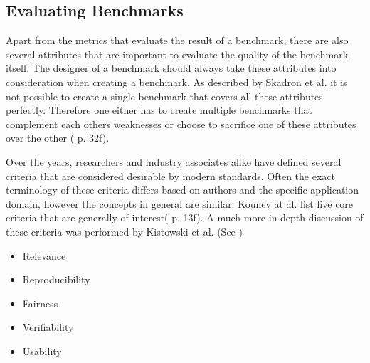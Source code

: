 \documentclass[	runningheads,
				a4paper]{llncs}
\begin{document}

\subsection{Evaluating Benchmarks}
\label{ssec:eval_bm}
Apart from the metrics that evaluate the result of a benchmark, there are also several attributes that are important to evaluate the quality of the benchmark itself. The designer of a benchmark should always take these attributes into consideration when creating a benchmark. As described by Skadron et al. it is not possible to create a single benchmark that covers all these attributes perfectly. Therefore one either has to create multiple benchmarks that complement each others weaknesses or choose to sacrifice one of these attributes over the other (\cite{Skadron2003} p. 32f).

Over the years, researchers and industry associates alike have defined several criteria that are considered desirable by modern standards. Often the exact terminology of these criteria differs based on authors and the specific application domain, however the concepts in general are similar. Kounev at al. list five core criteria that are generally of interest(\cite{Kounev} p. 13f). A much more in depth discussion of these criteria was performed by Kistowski et al. (See \cite{kistowski2015})
\begin{itemize}
	\item Relevance
	\item Reproducibility
	\item Fairness
	\item Verifiability
	\item Usability
\end{itemize}
\end{document}
